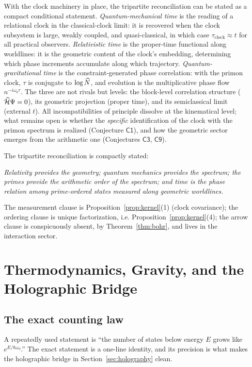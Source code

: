 With the clock machinery in place, the tripartite reconciliation can be stated as
a compact conditional statement. \emph{Quantum-mechanical time} is the reading of a
relational clock in the classical-clock limit: it is recovered when the clock subsystem is
large, weakly coupled, and quasi-classical, in which case $\tau_{\mathrm{clock}}\approx t$
for all practical observers. \emph{Relativistic time} is the proper-time functional along
worldlines: it is the geometric content of the clock's embedding, determining which phase
increments accumulate along which trajectory. \emph{Quantum-gravitational time} is the
constraint-generated phase correlation: with the primon clock, $\tau$ is conjugate to
$\log\widehat{N}$, and evolution is the multiplicative phase flow
$n^{-i\omega_{0}\tau}$. The three are not rivals but levels: the block-level correlation
structure ($\widehat{\mathcal{H}}\Psi=0$), its geometric projection (proper time), and its semiclassical
limit (external $t$). All incompatibilities of principle dissolve at the kinematical level;
what remains open
is whether the \emph{specific} identification of the clock with the
primon spectrum is realized (Conjecture $\mathsf{C1}$), and how the geometric sector
emerges from the arithmetic one (Conjectures $\mathsf{C3}$, $\mathsf{C9}$).

The tripartite reconciliation is compactly stated:
\begin{center}
\emph{Relativity provides the geometry; quantum mechanics provides the spectrum; the primes
provide the arithmetic order of the spectrum; and time is the phase relation among
prime-ordered states measured along geometric worldlines.}
\end{center}
The measurement clause is Proposition~\ref{prop:kernel}(1) (clock covariance); the ordering
clause is unique factorization, i.e. Proposition~\ref{prop:kernel}(4); the arrow clause is
conspicuously absent, by Theorem~\ref{thm:bohr}, and lives in the interaction sector.

\section{Thermodynamics, Gravity, and the Holographic Bridge}\label{sec:thermo}

\subsection{The exact counting law}

A repeatedly used statement is ``the number of states below energy $E$ grows like
$e^{E/\hbar\omega_{0}}$.'' The exact statement is a one-line identity, and its precision is
what makes the holographic bridge in Section~\ref{sec:holography} clean.

